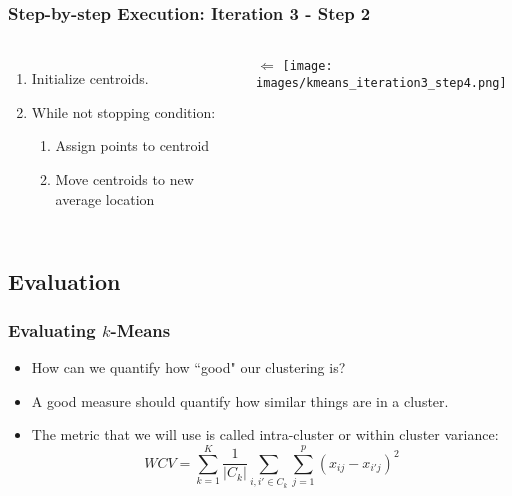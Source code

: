 \documentclass{beamer}
\begin{document}
\begin{frame}
  \frametitle{Step-by-step Execution: Iteration 3 - Step 2 }
  \begin{columns}
      \begin{enumerate}
        \item Initialize centroids. \vspace{2mm}
        \item While not stopping condition: \vspace{2mm}
        \begin{enumerate}
          \item Assign points to centroid \vspace{2mm}
          \item Move centroids to new average location
        \end{enumerate}
      \end{enumerate}
      \vspace{39mm} $\Longleftarrow$
      \texttt{[image: images/kmeans\_iteration3\_step4.png]}
  \end{columns}
\end{frame}

\subsection{Evaluation}
\begin{frame}
  \frametitle{Evaluating $k$-Means}
  \begin{itemize}
    \item How can we quantify how ``good" our clustering is? \vspace{2mm} \pause
    \item A good measure should quantify how similar things are in a cluster. \vspace{2mm} \pause
    \item The metric that we will use is called intra-cluster or within cluster variance: \\
      $$ WCV = \sum_{k=1}^K \frac{1}{\vert C_k \vert} \sum_{i,i'\in C_k} \sum_{j=1}^p (x_{ij}-x_{i'j})^2 $$
  \end{itemize}
\end{frame}
\end{document}
